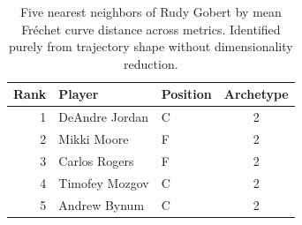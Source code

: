 \begin{table}[htbp]
  \centering\small
  \begin{tabular}{rllc}
    \toprule
    Rank & Player & Position & Archetype \\
    \midrule
    1 & DeAndre Jordan & C & 2 \\
    2 & Mikki Moore & F & 2 \\
    3 & Carlos Rogers & F & 2 \\
    4 & Timofey Mozgov & C & 2 \\
    5 & Andrew Bynum & C & 2 \\
    \bottomrule
  \end{tabular}
  \caption{Five nearest neighbors of Rudy Gobert by mean Fr\'{e}chet curve distance across metrics. Identified purely from trajectory shape without dimensionality reduction.}
  \label{tab:Rudy_Gobert_frechet_curve_neighbors}
\end{table}

